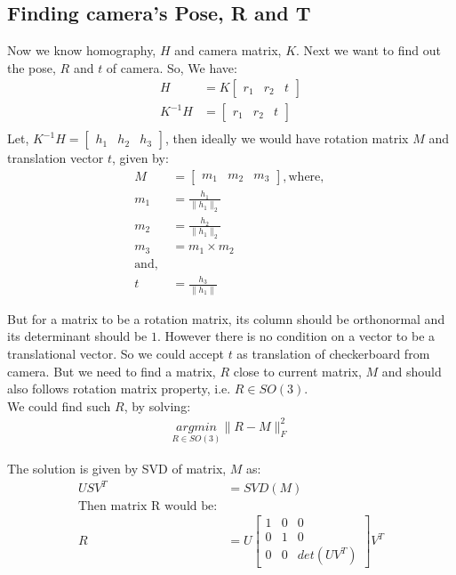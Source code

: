 \documentclass[a4paper]{article}
\begin{document}
\subsection{Finding camera's Pose, R and T}

Now we know homography, $H$ and camera matrix, $K$. Next we want to find out the pose, $R$ and $t$ of camera. So, We have:
\begin{align*}
    H &= K \begin{bmatrix} r_1 & r_2 & t \end{bmatrix}\\
    K^{-1}H &= \begin{bmatrix} r_1 & r_2 & t \end{bmatrix}\\
\end{align*}
Let,  $K^{-1}H = \begin{bmatrix} h_1 & h_2 & h_3\end{bmatrix}$, then ideally we would have rotation matrix $M$ and translation vector $t$, given by: 
\begin{align*}
    M &= \begin{bmatrix} m_1 & m_2 & m_3\end{bmatrix}, \text{where, }\\
    m_1 &= \frac{h_1}{\|h_1\|_2}\\
    m_2 &= \frac{h_2}{\|h_1\|_2}\\
    m_3 &= m_1 \times m_2\\
    \text{and, }\\
    t &= \frac{h_3}{\|h_1\|}
\end{align*}

But for a matrix to be a rotation matrix, its column should be orthonormal and its determinant should be $1$. However there is no condition on a vector to be a translational vector. So we could accept $t$ as translation of checkerboard from camera. But we need to find a matrix, $R$ close to current matrix, $M$ and should also follows rotation matrix property, i.e. $R \in SO(3)$.\\
We could find such $R$, by solving:
\begin{align*}
    \underset{R \in SO(3)}{argmin}\|R - M\|_{F}^2
\end{align*}

The solution is given by SVD of matrix, $M$ as: 
\begin{align*}
    USV^{T} &= SVD(M)\\
    \text{Then matrix R would be:}\\
    R &= U\begin{bmatrix}1 & 0 & 0\\ 0 & 1 & 0\\ 0 & 0 & det(UV^{T})\end{bmatrix}V^{T}
\end{align*}
\end{document}
